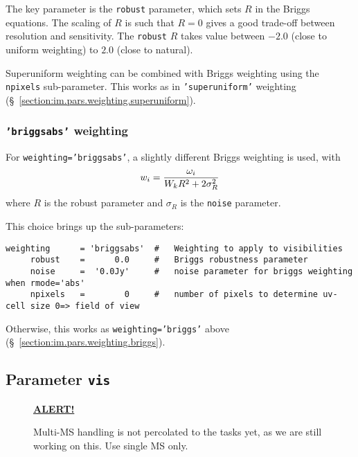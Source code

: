 The key parameter is the {\tt robust} parameter, which sets $R$ in the
Briggs equations.  The scaling of $R$ is such that $R = 0$ gives a
good trade-off between resolution and sensitivity. The {\tt robust}
$R$ takes value between $-2.0$ (close to uniform weighting) 
to $2.0$ (close to natural).

Superuniform weighting can be combined with Briggs weighting
using the {\tt npixels} sub-parameter.  This works as in 
{\tt 'superuniform'} weighting 
(\S~\ref{section:im.pars.weighting.superuniform}).

\subsubsection{{\tt 'briggsabs'} weighting }
\label{section:im.pars.weighting.briggsabs}

For {\tt weighting='briggsabs'}, a slightly different Briggs weighting is used,
with
\begin{equation}
  w_i={\omega_i\over{W_k R^2 + 2 \sigma_R^2}}
\end{equation}
where $R$ is the robust parameter and $\sigma_R$ is the {\tt noise}
parameter. 

This choice brings up the sub-parameters:
\small
\begin{verbatim}
weighting      = 'briggsabs'  #   Weighting to apply to visibilities 
     robust    =      0.0     #   Briggs robustness parameter
     noise     =  '0.0Jy'     #   noise parameter for briggs weighting when rmode='abs'
     npixels   =        0     #   number of pixels to determine uv-cell size 0=> field of view
\end{verbatim}
\normalsize

Otherwise, this works as {\tt weighting='briggs'} above 
(\S~\ref{section:im.pars.weighting.briggs}).

\subsection{Parameter {\tt vis} }
\label{section:im.pars.vis}

\begin{wrapfigure}{r}{2.5in}
  \begin{boxedminipage}{2.5in}
     \centerline{\underline{\bf ALERT!}}
     Multi-MS handling is not percolated to the tasks yet, as
     we are still working on this.  Use single MS only.
  \end{boxedminipage}
\end{wrapfigure}

